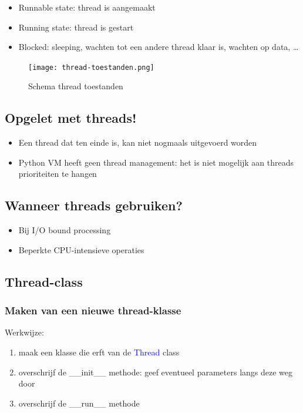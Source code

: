 \documentclass{article}
\begin{document}
\begin{itemize}
    \item Runnable state: thread is aangemaakt
    \item Running state: thread is gestart
    \item Blocked: sleeping, wachten tot een andere thread klaar is, wachten op data, \dots
\end{itemize}


\begin{figure}[H]
    \centering
    \texttt{[image: thread-toestanden.png]}
    \caption{Schema thread toestanden}
\end{figure}


\subsection{Opgelet met threads!}

\begin{itemize}
    \item Een thread dat ten einde is, kan niet nogmaals uitgevoerd worden
    \item Python VM heeft geen thread management: het is niet mogelijk aan threads prioriteiten te hangen
\end{itemize}

\subsection{Wanneer threads gebruiken?}

\begin{itemize}
    \item Bij I/O bound processing
    \item Beperkte CPU-intensieve operaties
\end{itemize}

\subsection{Thread-class}

\subsubsection{Maken van een nieuwe thread-klasse}

Werkwijze:

\begin{enumerate}
    \item maak een klasse die erft van de \textcolor{blue}{Thread} class
    \item overschrijf de \_\_init\_\_ methode: geef eventueel parameters langs deze weg door
    \item overschrijf de \_\_run\_\_ methode
\end{enumerate}
\end{document}
